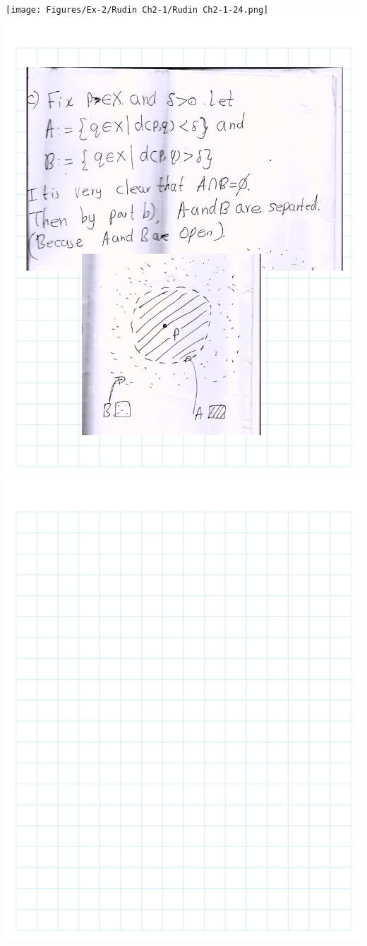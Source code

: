 \documentclass[
]{book}
\theoremstyle{definition}
\theoremstyle{definition}
\theoremstyle{definition}
\theoremstyle{definition}
\theoremstyle{remark}
\begin{document}
\texttt{[image: Figures/Ex-2/Rudin Ch2-1/Rudin Ch2-1-24.png]}
\includegraphics{Figures/Ex-2/Rudin Ch2-1/Rudin Ch2-1-25.png}
\includegraphics{Figures/Ex-2/Rudin Ch2-1/Rudin Ch2-1-26.png}
\end{document}
